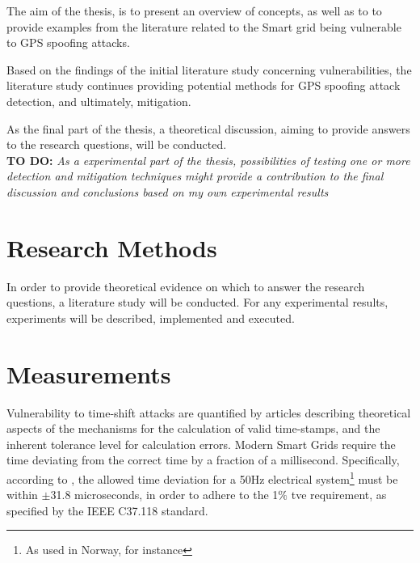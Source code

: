 The aim of the thesis, is to present an overview of concepts, as well as to to provide examples from the literature related to the Smart grid being vulnerable to GPS spoofing attacks. 

Based on the findings of the initial literature study concerning vulnerabilities, the literature study continues providing potential methods for GPS spoofing attack detection, and ultimately, mitigation.

As the final part of the thesis, a theoretical discussion, aiming to provide answers to the research questions, will be conducted.\\ 

\textbf{TO DO:}
\textit{As a experimental part of the thesis, possibilities of testing one or more detection and mitigation techniques might provide a contribution to the final discussion and conclusions based on my own experimental results}


\section{Research Methods}


In order to provide theoretical evidence on which to answer the research questions, a literature study will be conducted.
For any experimental results, experiments will be described, implemented and executed.

\section{Measurements}


Vulnerability to time-shift attacks are quantified by articles describing theoretical aspects of the mechanisms for the calculation of valid time-stamps, and the inherent tolerance level for calculation errors. Modern Smart Grids require the time deviating from the correct time by a fraction of a millisecond. Specifically, according to \cite[p.  1953]{moussa2016security}, the allowed time deviation for a 50Hz electrical system\footnote{As used in Norway, for instance} must be within $\pm$31.8 microseconds, in order to adhere to the 1$\%$ \acrfull{tve} requirement, as specified by the  IEEE C37.118 standard. \\ 

